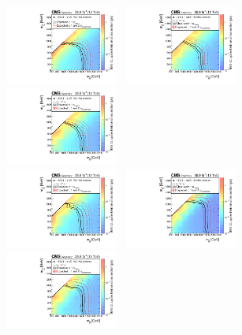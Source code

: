 \clearpage
\begin{figure}[!t]
  \centering
  \includegraphics[width=0.33\textwidth]{Figures/T1qqqqXSEC.pdf}~
  \includegraphics[width=0.33\textwidth]{Figures/T1qqqqLL0p001XSEC}~
  \includegraphics[width=0.33\textwidth]{Figures/T1qqqqLL0p01XSEC}\\
  \includegraphics[width=0.33\textwidth]{Figures/T1qqqqLL0p1XSEC}~
  \includegraphics[width=0.33\textwidth]{Figures/T1qqqqLL1XSEC}~
  \includegraphics[width=0.33\textwidth]{Figures/T1qqqqLL10XSEC}\\

\end{figure}
